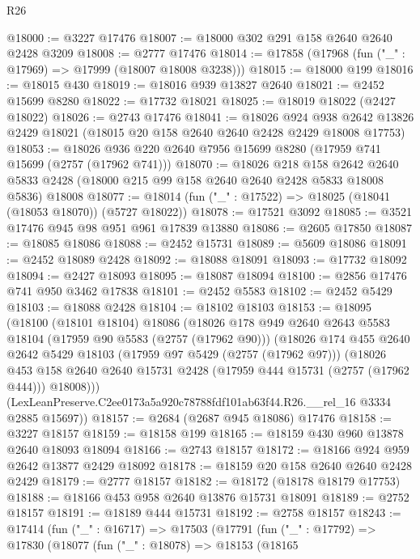 \begin{lexlean}{R26}
\begin{coremodule}
@18000 := @3227 @17476
@18007 := @18000 @302 @291 @158 @2640 @2640 @2428 @3209
@18008 := @2777 @17476
@18014 := @17858 (@17968 (fun ("_" : @17969) => @17999 (@18007 @18008 @3238)))
@18015 := @18000 @199
@18016 := @18015 @430
@18019 := @18016 @939 @13827 @2640
@18021 := @2452 @15699 @8280
@18022 := @17732 @18021
@18025 := @18019 @18022 (@2427 @18022)
@18026 := @2743 @17476
@18041 := @18026
    @924
    @938
    @2642
    @13826
    @2429
    @18021
    (@18015 @20 @158 @2640 @2640 @2428 @2429 @18008 @17753)
@18053 := @18026 @936 @220 @2640 @7956 @15699 @8280 (@17959 @741 @15699 (@2757 (@17962 @741)))
@18070 := @18026
    @218
    @158
    @2642
    @2640
    @5833
    @2428
    (@18000 @215 @99 @158 @2640 @2640 @2428 @5833 @18008 @5836)
    @18008
@18077 := @18014 (fun ("_" : @17522) => @18025 (@18041 (@18053 @18070)) (@5727 @18022))
@18078 := @17521 @3092
@18085 := @3521 @17476 @945 @98 @951 @961 @17839 @13880
@18086 := @2605 @17850
@18087 := @18085 @18086
@18088 := @2452 @15731
@18089 := @5609 @18086
@18091 := @2452 @18089 @2428
@18092 := @18088 @18091
@18093 := @17732 @18092
@18094 := @2427 @18093
@18095 := @18087 @18094
@18100 := @2856 @17476 @741 @950 @3462 @17838
@18101 := @2452 @5583
@18102 := @2452 @5429
@18103 := @18088 @2428
@18104 := @18102 @18103
@18153 := @18095
    (@18100
      (@18101 @18104)
      @18086
      (@18026
        @178
        @949
        @2640
        @2643
        @5583
        @18104
        (@17959 @90 @5583 (@2757 (@17962 @90)))
        (@18026
          @174
          @455
          @2640
          @2642
          @5429
          @18103
          (@17959 @97 @5429 (@2757 (@17962 @97)))
          (@18026
            @453
            @158
            @2640
            @2640
            @15731
            @2428
            (@17959 @444 @15731 (@2757 (@17962 @444)))
            @18008)))
      (LexLeanPreserve.C2ee0173a5a920c78788fdf101ab63f44.R26.__rel_16 @3334 @2885 @15697))
@18157 := @2684 (@2687 @945 @18086) @17476
@18158 := @3227 @18157
@18159 := @18158 @199
@18165 := @18159 @430 @960 @13878 @2640 @18093 @18094
@18166 := @2743 @18157
@18172 := @18166 @924 @959 @2642 @13877 @2429 @18092
@18178 := @18159 @20 @158 @2640 @2640 @2428 @2429
@18179 := @2777 @18157
@18182 := @18172 (@18178 @18179 @17753)
@18188 := @18166 @453 @958 @2640 @13876 @15731 @18091
@18189 := @2752 @18157
@18191 := @18189 @444 @15731
@18192 := @2758 @18157
@18243 := @17414
    (fun ("_" : @16717) =>
    @17503
      (@17791
        (fun ("_" : @17792) =>
        @17830
          (@18077
            (fun ("_" : @18078) =>
            @18153
              (@18165

\end{coremodule}
\end{lexlean}
